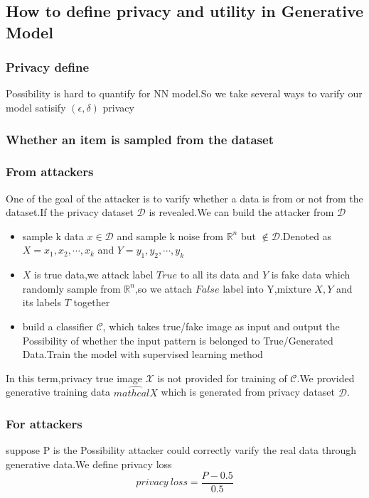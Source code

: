 \documentclass{beamer}
\newcommand{\R}{\mathbb{R}}
\begin{document}
\subsection{How to define privacy and utility in Generative Model}
\begin{frame}
    \frametitle{Privacy define}
    Possibility is hard to quantify for NN model.So we take several ways to varify our model satisify $(\epsilon,\delta)$ privacy
\end{frame}
\subsubsection{Whether an item is sampled from the dataset}
\begin{frame}
  \frametitle{From attackers}
  One of the goal of the attacker is to varify whether a data is from or not from the dataset.If the privacy dataset $\mathcal D$ is revealed.We can build the attacker from $\mathcal D$
  \begin{itemize}
    \item sample k data $x\in \mathcal D$ and sample k noise from $\R^n$ but $\notin \mathcal D$.Denoted as $X = x_1,x_2,\cdots,x_k$ and $Y = y_1,y_2,\cdots,y_k$
    \item $X$ is true data,we attack label $True$ to all its data and $Y$ is fake data which randomly sample from $\R^n$,so we attach $False$ label into Y,mixture $X,Y$ and its labels $T$ together
    \item build a classifier $\mathcal{C}$, which takes true/fake image as input and output the Possibility of whether the input pattern is belonged to True/Generated Data.Train the model with supervised learning method
  \end{itemize}
  In this term,privacy true image $\mathcal{X}$ is not provided for training of $\mathcal{C}$.We provided generative training data $\hat {mathcal{X}}$ which is generated from privacy dataset $\mathcal{D}$.
\end{frame}
\begin{frame}
  \frametitle{For attackers}
  suppose P is the Possibility attacker could correctly varify the real data through generative data.We define privacy loss
  \begin{equation}
    privacy\ loss = \frac{P-0.5}{0.5}
  \end{equation}
\end{frame}
\end{document}
